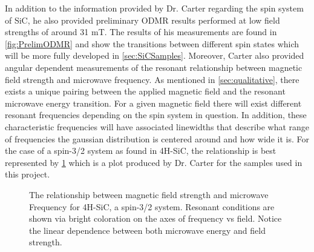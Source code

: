 \documentclass[oneside, astronomy, noacknowlegments]{BYUPhys}
\begin{document}
In addition to the information provided by Dr. Carter regarding the spin system of SiC, he also provided preliminary ODMR results performed at low field strengths of around 31 mT. The results of his measurements are found in \ref{fig:PrelimODMR} and show the transitions between different spin states which will be more fully developed in \ref{sec:SiCSamples}. Moreover, Carter also provided angular dependent measurements of the resonant relationship between magnetic field strength and microwave frequency. As mentioned in \ref{sec:qualitative}, there exists a unique pairing between the applied magnetic field and the resonant microwave energy transition. For a given magnetic field there will exist different resonant frequencies depending on the spin system in question. In addition, these characteristic frequencies will have associated linewidths that describe what range of frequencies the gaussian distribution is centered around and how wide it is. For the case of a spin-3/2 system as found in 4H-SiC, the relationship is best represented by \ref{fig:MFRelationship} which is a plot produced by Dr. Carter for the samples used in this project.

\begin{figure}
    \caption[Magnetic field and microwave frequency relationship]{\label{fig:MFRelationship}
     The relationship between magnetic field strength and microwave Frequency for 4H-SiC, a spin-3/2 system. Resonant conditions are shown via bright coloration on the axes of frequency vs field. Notice the linear dependence between both microwave energy and field strength.}
 \end{figure}
 
\end{document}
